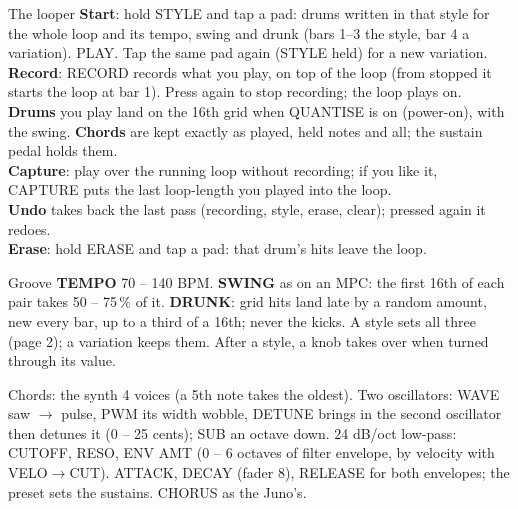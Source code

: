 \documentclass{article}
\newcommand{\GV}[1]{\textcolor{gvc}{#1}}
\newcommand{\DR}[1]{\textcolor{drc}{#1}}
\newcommand{\CH}[1]{\textcolor{chc}{#1}}
\newcommand{\TR}[1]{\textcolor{trc}{#1}}
\begin{document}
\vspace{1.2mm}
\begin{minipage}[t]{72mm}\vspace{0pt}
\begin{card}{The looper}
\textbf{Start}: hold \TR{STYLE} and tap a pad: drums written in that style for the whole loop
and its tempo, swing and drunk (bars 1--3 the style, bar 4 a variation). \TR{PLAY}. Tap the same pad again (STYLE held) for a new variation.\\[0.4mm]
\textbf{Record}: \TR{RECORD} records what you play, on top of the loop (from stopped it starts the loop
at bar 1). Press again to stop recording; the loop plays on.\\[0.4mm]
\textbf{Drums} you play land on the 16th grid when \TR{QUANTISE} is on (power-on), with the swing.
\textbf{Chords} are kept exactly as played, held notes and all; the sustain pedal holds them.\\[0.4mm]
\textbf{Capture}: play over the running loop without recording; if you like it, \TR{CAPTURE} puts the last
loop-length you played into the loop.\\[0.4mm]
\textbf{Undo} takes back the last pass (recording, style, erase, clear); pressed again it redoes.\\[0.4mm]
\textbf{Erase}: hold \DR{ERASE} and tap a pad: that drum's hits leave the loop.
\end{card}
\end{minipage}\hfill
\begin{minipage}[t]{70mm}\vspace{0pt}
\begin{card}{Groove}
\GV{\textbf{TEMPO}} 70 -- 140 BPM. \GV{\textbf{SWING}} as on an MPC: the first 16th of each pair takes
50 -- 75\,\% of it. \GV{\textbf{DRUNK}}: grid hits land late by a random amount, new every bar, up to a third
of a 16th; never the kicks. A style sets all three (page 2); a variation keeps them. After a style,
a knob takes over when turned through its value.
\end{card}
\begin{card}{Chords: the synth}
4 voices (a 5th note takes the oldest). Two oscillators: \CH{WAVE} saw \(\to\) pulse, \CH{PWM} its
width wobble, \CH{DETUNE} brings in the second oscillator then detunes it (0 -- 25 cents);
\CH{SUB} an octave down. 24 dB/oct low-pass: \textcolor{fltc}{CUTOFF}, \textcolor{fltc}{RESO}, \textcolor{fltc}{ENV AMT}
(0 -- 6 octaves of filter envelope, by velocity with VELO\(\to\)CUT). \CH{ATTACK}, \CH{DECAY} (fader 8),
\CH{RELEASE} for both envelopes; the preset sets the sustains. \CH{CHORUS} as the Juno's.
\end{card}
\end{minipage}\hfill
\end{document}
